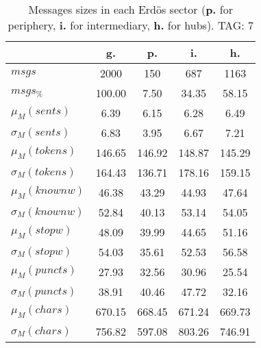 \begin{table}[h!]
\begin{center}
\begin{tabular}{| l || c | c | c | c |}\hline
 & {\bf g.} & {\bf p.} & {\bf i.} & {\bf h.} \\\hline\hline
$msgs$ & 2000  & 150  & 687  & 1163 \\
$msgs_{\%}$ & 100.00  & 7.50  & 34.35  & 58.15 \\\hline
$\mu_M(sents)$ & 6.39  & 6.15  & 6.28  & 6.49 \\
$\sigma_M(sents)$ & 6.83  & 3.95  & 6.67  & 7.21 \\\hline
$\mu_M(tokens)$ & 146.65  & 146.92  & 148.87  & 145.29 \\
$\sigma_M(tokens)$ & 164.43  & 136.71  & 178.16  & 159.15 \\\hline
$\mu_M(knownw)$ & 46.38  & 43.29  & 44.93  & 47.64 \\
$\sigma_M(knownw)$ & 52.84  & 40.13  & 53.14  & 54.05 \\\hline
$\mu_M(stopw)$ & 48.09  & 39.99  & 44.65  & 51.16 \\
$\sigma_M(stopw)$ & 54.03  & 35.61  & 52.53  & 56.58 \\\hline
$\mu_M(puncts)$ & 27.93  & 32.56  & 30.96  & 25.54 \\
$\sigma_M(puncts)$ & 38.91  & 40.46  & 47.72  & 32.16 \\\hline
$\mu_M(chars)$ & 670.15  & 668.45  & 671.24  & 669.73 \\
$\sigma_M(chars)$ & 756.82  & 597.08  & 803.26  & 746.91 \\\hline
\end{tabular}
\caption{Messages sizes in each Erd\"os sector ({{\bf p.}} for periphery, {{\bf i.}} for intermediary, {{\bf h.}} for hubs). TAG: 7}
\end{center}
\end{table}